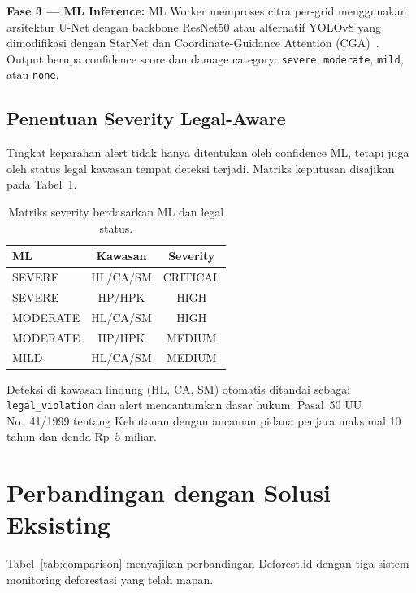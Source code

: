 \documentclass[10pt,conference,a4paper]{IEEEtran}
\begin{document}
\noindent\textbf{Fase 3 --- ML Inference:} ML Worker memproses citra
per-grid menggunakan arsitektur U-Net dengan backbone ResNet50 atau
alternatif YOLOv8 yang dimodifikasi dengan StarNet dan
Coordinate-Guidance Attention (CGA)~\cite{yolo2026}. Output berupa
confidence score dan damage category: \texttt{severe}, \texttt{moderate},
\texttt{mild}, atau \texttt{none}.

\subsection{Penentuan Severity Legal-Aware}

Tingkat keparahan alert tidak hanya ditentukan oleh confidence ML,
tetapi juga oleh status legal kawasan tempat deteksi terjadi. Matriks
keputusan disajikan pada Tabel~\ref{tab:severity}.

\begin{table}[H]
\centering
\caption{Matriks severity berdasarkan ML dan legal status.}
\label{tab:severity}
\small
\begin{tabular}{lcc}
\toprule
\textbf{ML} & \textbf{Kawasan} & \textbf{Severity} \\
\midrule
SEVERE & HL/CA/SM & CRITICAL \\
SEVERE & HP/HPK & HIGH \\
MODERATE & HL/CA/SM & HIGH \\
MODERATE & HP/HPK & MEDIUM \\
MILD & HL/CA/SM & MEDIUM \\
\bottomrule
\end{tabular}
\end{table}

Deteksi di kawasan lindung (HL, CA, SM) otomatis ditandai sebagai
\texttt{legal\_violation} dan alert mencantumkan dasar hukum:
Pasal~50 UU No.~41/1999 tentang Kehutanan dengan ancaman pidana
penjara maksimal 10 tahun dan denda Rp~5 miliar.

\section{Perbandingan dengan Solusi Eksisting}

Tabel~\ref{tab:comparison} menyajikan perbandingan Deforest.id dengan
tiga sistem monitoring deforestasi yang telah mapan.
\end{document}
